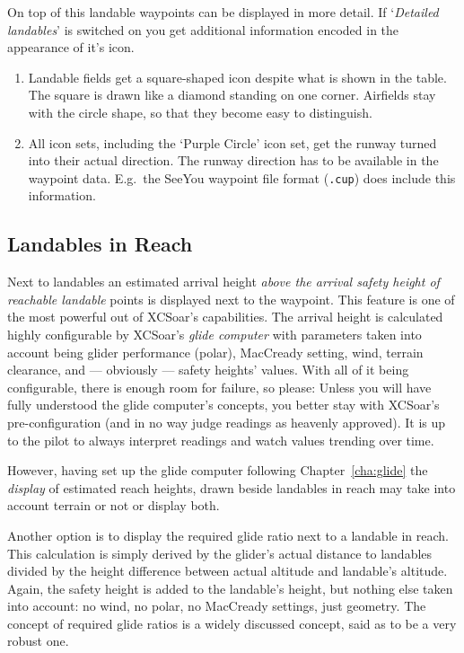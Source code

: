 On top of this landable waypoints can be displayed in more detail. If
`\emph{Detailed landables}' is switched on you get additional information
encoded in the appearance of it's icon. 
\begin{enumerate}
\item  Landable fields get a square-shaped icon despite what is shown in the table.
  The square is drawn like a diamond standing on one corner. Airfields stay with the 
  circle shape, so that they become easy to distinguish.
\item  All icon sets, including the `Purple Circle' icon set, get the 
  runway turned into their actual direction. The runway direction has to be available in 
  the waypoint data. E.g.\ the SeeYou waypoint file format (\verb|.cup|) does
  include this information.  
\end{enumerate}

\subsection*{Landables in Reach}
Next to landables an estimated arrival height
\emph{above the arrival safety height of reachable landable} points is
displayed next to the waypoint. This feature is one of the most powerful out 
of XCSoar's capabilities. The arrival height is calculated highly 
configurable by XCSoar's \emph{glide computer} with parameters taken into 
account being glider performance (polar), MacCready setting, wind, terrain 
clearance, and --- obviously --- safety heights' values.
With all of it being 
configurable, there is enough room for failure, so please:
Unless you will have fully understood the glide computer's concepts, you 
\warning
better stay with XCSoar's pre-configuration (and in no way judge readings as 
heavenly approved).
It is up to the pilot to always interpret readings and watch values trending 
over time.

However, having set up the glide computer following
Chapter~\ref{cha:glide} the \emph{display} of estimated reach heights, drawn beside 
landables in reach may take into account terrain or not or display both.

Another option is to display the required glide ratio next to a landable in 
reach. This calculation is simply derived by the glider's actual distance to 
landables divided by the height difference between actual altitude and 
landable's altitude.  Again, the safety height is added to the landable's 
height, but nothing else taken into account: no wind, no polar, no MacCready 
settings, just geometry. The concept of required glide ratios is a widely 
discussed concept, said as to be a very robust one.

